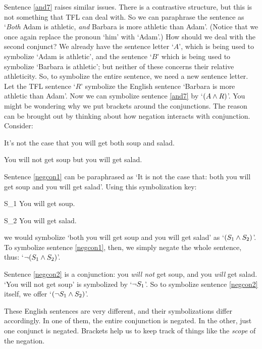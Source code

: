 Sentence \ref{and7} raises similar issues. There is a contrastive structure, but this is not something that TFL can deal with. So we can paraphrase the sentence as `\emph{Both} Adam is athletic, \emph{and} Barbara is more athletic than Adam'. (Notice that we once again replace the pronoun `him' with `Adam'.) How should we deal with the second conjunct? We already have the sentence letter `$A$', which is being used to symbolize `Adam is athletic', and the sentence `$B$' which is being used to symbolize `Barbara is athletic'; but neither of these concerns their relative athleticity. So, to symbolize the entire sentence, we need a new sentence letter. Let the TFL sentence `$R$' symbolize the English sentence `Barbara is more athletic than Adam'. Now we can symbolize sentence \ref{and7} by `$(A \wedge R)$'.
You might be wondering why we put brackets around the conjunctions. The reason can be brought out by thinking about how negation interacts with conjunction. Consider:
	\begin{earg}
		\item[\ex{negcon1}] It's not the case that you will get both soup and salad.
		\item[\ex{negcon2}] You will not get soup but you will get salad.
	\end{earg}
Sentence \ref{negcon1} can be paraphrased as `It is not the case that: both you will get soup and you will get salad'. Using this symbolization key:
	\begin{ekey}
		\item[S_1] You will get soup.
		\item[S_2] You will get salad.
	\end{ekey}
we would symbolize `both you will get soup and you will get salad' as `$(S_1 \wedge S_2)$'. To symbolize sentence \ref{negcon1}, then, we simply negate the whole sentence, thus: `$\neg (S_1 \wedge S_2)$'.

Sentence \ref{negcon2} is a conjunction: you \emph{will not} get soup, and you \emph{will} get salad. `You will not get soup' is symbolized by `$\neg S_1$'. So to symbolize sentence \ref{negcon2} itself, we offer `$(\neg S_1 \wedge S_2)$'.

These English sentences are very different, and their symbolizations differ accordingly. In one of them, the entire conjunction is negated. In the other, just one conjunct is negated. Brackets help us to keep track of things like the \emph{scope} of the negation.

